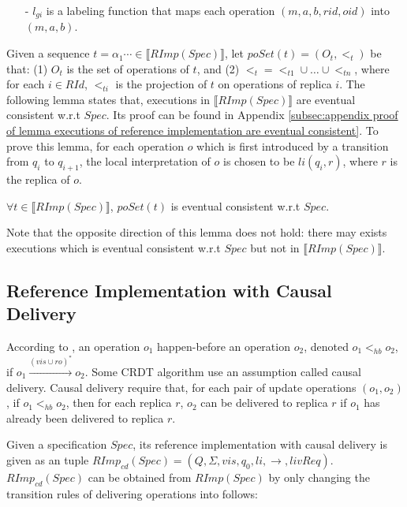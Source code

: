 {\begin{itemize}
    Then, $<_{gi} = (ord(1) \cup \ldots) - \{(o,r) \vert o \in OId, r \in RId\}$.

\item[-] $l_{gi}$ is a labeling function that maps each operation $(m,a,b,rid,oid)$ into $(m,a,b)$.
\end{itemize}

Given a sequence $t = \alpha_1 \cdots \in \llbracket RImp(Spec) \rrbracket$, let $poSet(t)=(O_t,<_t)$ be that: (1) $O_t$ is the set of operations of $t$, and (2) $<_t = <_{t1} \cup \ldots \cup <_{tn}$, where for each $i \in RId$, $<_{ti}$ is the projection of $t$ on operations of replica $i$. The following lemma states that, executions in $\llbracket RImp(Spec) \rrbracket$ are eventual consistent w.r.t $Spec$. Its proof can be found in Appendix \ref{subsec:appendix proof of lemma executions of reference implementation are eventual consistent}. To prove this lemma, for each operation $o$ which is first introduced by a transition from $q_i$ to $q_{i+1}$, the local interpretation of $o$ is chosen to be $li(q_i,r)$, where $r$ is the replica of $o$.

\begin{lemma}
\label{lemma:executions of reference implementation are eventual consistent}
$\forall t \in \llbracket RImp(Spec) \rrbracket$, $poSet(t)$ is eventual consistent w.r.t $Spec$.
\end{lemma}

Note that the opposite direction of this lemma does not hold: there may exists executions which is eventual consistent w.r.t $Spec$ but not in $\llbracket RImp(Spec) \rrbracket$.



\subsection{Reference Implementation with Causal Delivery}
\label{subsec:reference implementation with causal delivery}

According to \cite{Lamport:1978}, an operation $o_1$ happen-before an operation $o_2$, denoted $o_1 <_{hb} o_2$, if $o_1 {\xrightarrow{ (vis \cup ro)^* }} o_2$. Some CRDT algorithm use an assumption called causal delivery. Causal delivery require that, for each pair of update operations $(o_1,o_2)$, if $o_1 <_{hb} o_2$, then for each replica $r$, $o_2$ can be delivered to replica $r$ if $o_1$ has already been delivered to replica $r$.

Given a specification $Spec$, its reference implementation with causal delivery is given as an tuple $RImp_{cd}(Spec) = (Q,\Sigma,vis,q_0,li,\rightarrow,livReq)$. $RImp_{cd}(Spec)$ can be obtained from $RImp(Spec)$ by only changing the transition rules of delivering operations into follows:

}
